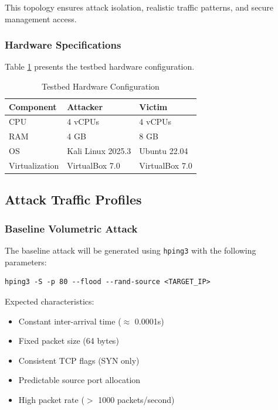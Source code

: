 This topology ensures attack isolation, realistic traffic patterns, and secure management access.

\subsubsection{Hardware Specifications}

Table \ref{tab:hardware} presents the testbed hardware configuration.

\begin{table}[h]
\centering
\caption{Testbed Hardware Configuration}
\label{tab:hardware}
\begin{tabular}{lll}
\toprule
\textbf{Component} & \textbf{Attacker} & \textbf{Victim} \\
\midrule
CPU & 4 vCPUs & 4 vCPUs \\
RAM & 4 GB & 8 GB \\
OS & Kali Linux 2025.3 & Ubuntu 22.04 \\
Virtualization & VirtualBox 7.0 & VirtualBox 7.0 \\
\bottomrule
\end{tabular}
\end{table}

\subsection{Attack Traffic Profiles}

\subsubsection{Baseline Volumetric Attack}

The baseline attack will be generated using \texttt{hping3} with the following parameters:

\begin{verbatim}
hping3 -S -p 80 --flood --rand-source <TARGET_IP>
\end{verbatim}

Expected characteristics:
\begin{itemize}
    \item Constant inter-arrival time ($\approx$ 0.0001s)
    \item Fixed packet size (64 bytes)
    \item Consistent TCP flags (SYN only)
    \item Predictable source port allocation
    \item High packet rate ($>$ 1000 packets/second)
\end{itemize}

